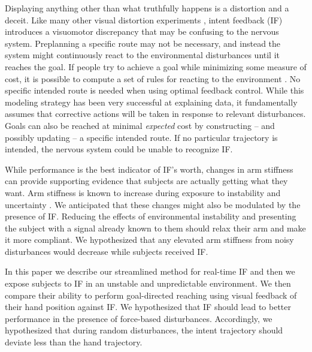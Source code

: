 \documentclass{frontiersSCNS} %
\begin{document}
Displaying anything other than what truthfully happens is a distortion and a deceit. Like many other visual distortion experiments \citep{miles1980long, pine1996learning}, intent feedback (IF) introduces a visuomotor discrepancy that may be confusing to the nervous system. Preplanning a specific route may not be necessary, and instead the system might continuously react to the environmental disturbances until it reaches the goal. If people try to achieve a goal while minimizing some measure of cost, it is possible to compute a set of rules for reacting to the environment \citep{todorov2002optimal}. No specific intended route is needed when using optimal feedback control. While this modeling strategy has been very successful at explaining data, it fundamentally assumes that corrective actions will be taken in response to relevant disturbances. Goals can also be reached at minimal \textit{expected} cost by constructing -- and possibly updating -- a specific intended route. If no particular trajectory is intended, the nervous system could be unable to recognize IF.

While performance is the best indicator of IF's worth, changes in arm stiffness can provide supporting evidence that subjects are actually getting what they want. Arm stiffness is known to increase during exposure to instability \citep{franklin2003adaptation} and uncertainty \citep{takahashi2001impedance}. We anticipated that these changes might also be modulated by the presence of IF. Reducing the effects of environmental instability and presenting the subject with a signal already known to them should relax their arm and make it more compliant. We hypothesized that any elevated arm stiffness from noisy disturbances would decrease while subjects received IF.

In this paper we describe our streamlined method for real-time IF and then we expose subjects to IF in an unstable and unpredictable environment. We then compare their ability to perform goal-directed reaching using visual feedback of their hand position against IF. We hypothesized that IF should lead to better performance in the presence of force-based disturbances. Accordingly, we hypothesized that during random disturbances, the intent trajectory should deviate less than the hand trajectory.
\end{document}
